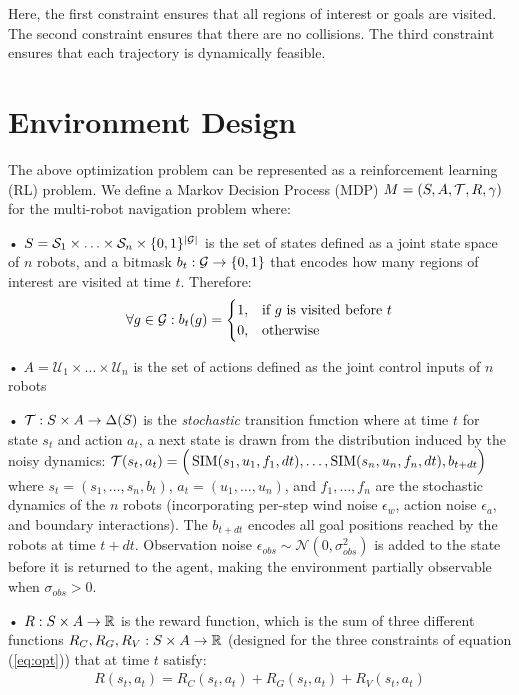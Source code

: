 \documentclass[letterpaper, 10 pt, conference]{ieeeconf}  %
\begin{document}
Here, the first constraint ensures that all regions of interest or goals are visited. The second constraint ensures that there are no collisions. The third constraint ensures that each trajectory is dynamically feasible.

\section{Environment Design}
The above optimization problem can be represented as a reinforcement learning (RL) problem. We define a Markov Decision Process (MDP) $M = (S, A, \mathcal{T}, R, \gamma)$ for the multi-robot navigation problem where:

• $S = \mathcal{S}_1 \times \ldots \times \mathcal{S}_n \times \{0, 1 \}^{|\mathcal{G}|}$ is the set of states defined as a joint state space of $n$ robots, and a bitmask $b_t: \mathcal{G} \to \{0, 1\}$ that encodes how many regions of interest are visited at time $t$. Therefore: 
\begin{equation}
\forall g \in \mathcal{G}: b_t(g) =
\begin{cases}
    1, &\text{if $g$ is visited before $t$} \\
    0, &\text{otherwise}
\end{cases}
\end{equation}

• $A = \mathcal{U}_1 \times \ldots \times \mathcal{U}_n$ is the set of actions defined as the joint control inputs of $n$ robots

• $\mathcal{T}: S \times A \to \Delta(S)$ is the \emph{stochastic} transition function where at time $t$ for state $s_t$ and action $a_t$, a next state is drawn from the distribution induced by the noisy dynamics: $\mathcal{T}(s_t,a_t) = \Big( \operatorname{SIM}(s_1,u_1,f_1,dt), \ldots , \operatorname{SIM}(s_n,u_n,f_n,dt), b_{t+dt} \Big)$ where $s_t = (s_1,\ldots,s_n, b_t)$, $a_t = (u_1,\ldots,u_n)$, and $f_1,\ldots, f_n$ are the stochastic dynamics of the $n$ robots (incorporating per-step wind noise $\epsilon_w$, action noise $\epsilon_a$, and boundary interactions). The $b_{t+dt}$ encodes all goal positions reached by the robots at time $t+dt$. Observation noise $\epsilon_{obs} \sim \mathcal{N}(0, \sigma_{obs}^2)$ is added to the state before it is returned to the agent, making the environment partially observable when $\sigma_{obs} > 0$.

• $R: S \times A \to \mathbb{R}$ is the reward function, which is the sum of three different functions $R_C, R_G, R_V: S \times A \to \mathbb{R}$ (designed for the three constraints of equation (\ref{eq:opt})) that at time $t$ satisfy:
\begin{align}
\label{eq:reward}
    R(s_t,a_t) = R_C(s_t,a_t) + R_G(s_t,a_t) + R_V (s_t,a_t)
\end{align}
\end{document}
